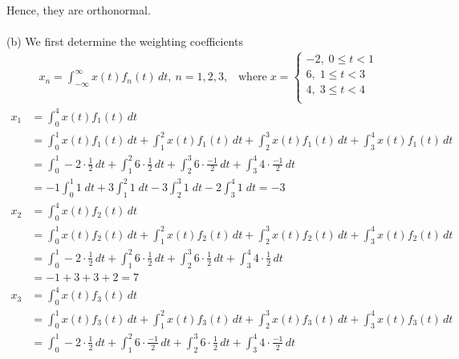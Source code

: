 \documentclass[a4paper,12pt]{article}
\begin{document}
\begin{enumerate}
        Hence, they are orthonormal.\\ \\ 
        (b) We first determine the weighting coefficients
        \begin{align*}
            x_n=\int_{-\infty}^{\infty}x(t)f_n(t)\, dt,\ n=1,2,3, \;\;\; \text{where} \; x = \left\{ 
            \begin{aligned}
                -2, \; 0 \leq t < 1 \\
                 6, \; 1 \leq t < 3 \\ 
                 4, \; 3 \leq t < 4 \\
            \end{aligned}
            \right.
        \end{align*}
        \begin{align*}
            x_1 &= \int_{0}^{4}x(t)f_1(t)\, dt \\
                &= \int_{0}^{1}x(t)f_1(t)\, dt + \int_{1}^{2}x(t)f_1(t)\, dt 
                 + \int_{2}^{3}x(t)f_1(t)\, dt + \int_{3}^{4}x(t)f_1(t)\, dt \\
                &= \int_{0}^{1} -2 \cdot \frac{1}{2}\,dt + \int_{1}^{2} 6 \cdot \frac{1}{2}\,dt 
                 + \int_{2}^{3} 6 \cdot \frac{-1}{2}\,dt + \int_{3}^{4} 4 \cdot \frac{-1}{2}\,dt \\
                &= -1 \int_{0}^{1}1 \; dt + 3 \int_{1}^{2}1 \; dt 
                 - 3 \int_{2}^{3}1 \; dt - 2 \int_{3}^{4}1 \; dt = -3 \\
            x_2 &= \int_{0}^{4}x(t)f_2(t)\, dt \\
                &= \int_{0}^{1}x(t)f_2(t)\, dt + \int_{1}^{2}x(t)f_2(t)\, dt 
                 + \int_{2}^{3}x(t)f_2(t)\, dt + \int_{3}^{4}x(t)f_2(t)\, dt \\
                &= \int_{0}^{1} -2 \cdot \frac{1}{2}\,dt + \int_{1}^{2} 6 \cdot \frac{1}{2}\,dt 
                 + \int_{2}^{3} 6 \cdot \frac{1}{2}\,dt + \int_{3}^{4} 4 \cdot \frac{1}{2}\,dt \\
                &= -1 + 3 + 3 + 2 = 7 \\
            x_3 &= \int_{0}^{4}x(t)f_3(t)\, dt \\
                &= \int_{0}^{1}x(t)f_3(t)\, dt + \int_{1}^{2}x(t)f_3(t)\, dt 
                 + \int_{2}^{3}x(t)f_3(t)\, dt + \int_{3}^{4}x(t)f_3(t)\, dt \\
                &= \int_{0}^{1} -2 \cdot \frac{1}{2}\,dt + \int_{1}^{2} 6 \cdot \frac{-1}{2}\,dt 
                 + \int_{2}^{3} 6 \cdot \frac{1}{2}\,dt + \int_{3}^{4} 4 \cdot \frac{-1}{2}\,dt \\

\end{align*}
\end{enumerate}
\end{document}
